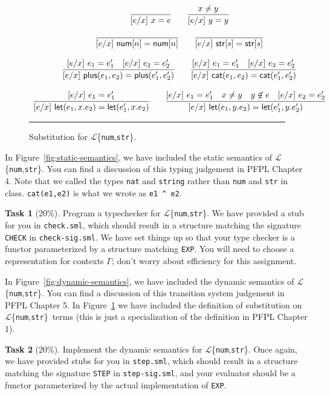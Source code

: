 \documentclass[11pt]{article}
\newcommand{\task}[2]
  {\bigskip \noindent
   {\bf Task #1} (#2\%).}
\newcommand{\ms}[1]{\ensuremath{\mathsf{#1}}}
\newcommand{\ttt}[1]{\texttt{#1}}
\newcommand{\anum}[1]{\ms{num}[#1]}
\newcommand{\astr}[1]{\ms{str}[#1]}
\newcommand{\anumn}{\anum{n}}
\newcommand{\astrs}{\astr{s}}
\newcommand{\aplus}[2]{\ms{plus}(#1, #2)}
\newcommand{\acat}[2]{\ms{cat}(#1, #2)}
\newcommand{\alet}[3]{\ms{let}(#1, #2.#3)}
\newcommand{\EXP}[0]{$\mathcal{L}$\{\texttt{num},\texttt{str}\}}
\newcommand{\sub}[3]{\ensuremath{[#2 / #1]\ #3}}
\newcommand{\subeq}[4]{\sub{#1}{#2}{#3} = #4}
\begin{document}
\begin{figure}

\[
\begin{array}{c}
\infer{\subeq{x}{e}{x}{e}}{}
\qquad
\infer{\subeq{x}{e}{y}{y}}{{x} \neq {y}}\\
\\
\infer{\subeq{x}{e}{\anumn}{\anumn}}{}
\qquad
\infer{\subeq{x}{e}{\astrs}{\astrs}}{}\\
\\
\infer{\subeq{x}{e}{\aplus{e_1}{e_2}}{\aplus{e_1'}{e_2'}}}{\subeq{x}{e}{e_1}{e_1'} & \subeq{x}{e}{e_2}{e_2'}}
\qquad
\infer{\subeq{x}{e}{\acat{e_1}{e_2}}{\acat{e_1'}{e_2'}}}{\subeq{x}{e}{e_1}{e_1'} & \subeq{x}{e}{e_2}{e_2'}}\\
\\
\infer{\subeq{x}{e}{\alet{e_1}{x}{e_2}}{\alet{e_1'}{x}{e_2}}}{\subeq{x}{e}{e_1}{e_1'}}
\qquad
\infer{\subeq{x}{e}{\alet{e_1}{y}{e_2}}{\alet{e_1'}{y}{e_2'}}}{\subeq{x}{e}{e_1}{e_1'} & {x}\neq{y} & {y}\not\in{e} & \subeq{x}{e}{e_2}{e_2'}}
\end{array}
\]

\hrule
\caption{Substitution for \EXP.}
\label{fig:exp-sub}
\end{figure}

In Figure~\ref{fig:static-semantics}, we have included the static
semantics of \EXP.  You can find a discussion of this typing judgement
in PFPL Chapter 4.  Note that we called the types \verb|nat| and
\verb|string| rather than \verb|num| and \verb|str| in class.
\verb|cat(e1,e2)| is what we wrote as \verb|e1 ^ e2|.  

\task{1}{20} Program a typechecker for \EXP.  We have provided a stub
for you in \ttt{check.sml}, which should result in a structure matching
the signature \ttt{CHECK} in \ttt{check-sig.sml}.  We have set things up
so that your type checker is a functor parameterized by a structure
matching \ttt{EXP}.  You will need to choose a representation for
contexts $\Gamma$; don't worry about efficiency for this assignment.  

\bigskip

In Figure~\ref{fig:dynamic-semantics}, we have included the dynamic
semantics of \EXP. You can find a discussion of this transition system
judgement in PFPL Chapter 5. In Figure~\ref{fig:exp-sub} we have
included the definition of substitution on \EXP\ terms (this is just a
specialization of the definition in PFPL Chapter 1).

\task{2}{20} Implement the dynamic semantics for \EXP.
Once again, we have provided stubs for you in \ttt{step.sml}, which
should result in a structure matching the signature \ttt{STEP} in
\ttt{step-sig.sml}, and your evaluator should be a functor parameterized
by the actual implementation of \ttt{EXP}.  
\end{document}
